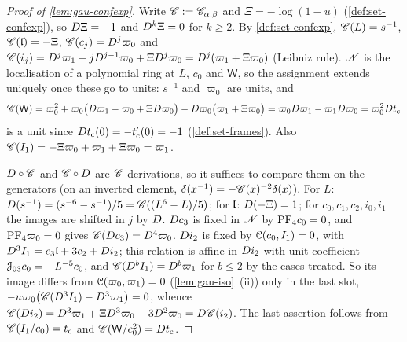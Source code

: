 \begin{proof}[Proof of \cref{lem:gau-confexp}]
Write $\mathscr{C}:=\mathscr{C}_{\alpha,\beta}$ and $\Xi=-\log(1-u)$ (\cref{def:set-confexp}), so $D\Xi=-1$ and $D^k\Xi=0$ for $k\geq2$. By \cref{def:set-confexp}, $\mathscr{C}(L)=s^{-1}$, $\mathscr{C}(\mathfrak{l})=-\Xi$, $\mathscr{C}(c_j)=D^j\varpi_0$ and $\mathscr{C}(i_j)=D^j\varpi_1-jD^{j-1}\varpi_0+\Xi D^j\varpi_0=D^j(\varpi_1+\Xi\varpi_0)$ (Leibniz rule). $\mathscr{N}$ is the localisation of a polynomial ring at $L$, $c_0$ and $\mathsf W$, so the assignment extends uniquely once these go to units: $s^{-1}$ and $\varpi_0$ are units, and
\[
\mathscr{C}(\mathsf W)=\varpi_0^2+\varpi_0\bigl(D\varpi_1-\varpi_0+\Xi D\varpi_0\bigr)-D\varpi_0\bigl(\varpi_1+\Xi\varpi_0\bigr)=\varpi_0D\varpi_1-\varpi_1D\varpi_0=\varpi_0^2Dt_{\mathrm{c}}
\]
is a unit since $Dt_{\mathrm{c}}(0)=-t_{\mathrm{c}}'(0)=-1$ (\cref{def:set-frames}). Also $\mathscr{C}(I_1)=-\Xi\varpi_0+\varpi_1+\Xi\varpi_0=\varpi_1$.

$D\circ\mathscr{C}$ and $\mathscr{C}\circ D$ are $\mathscr{C}$-derivations, so it suffices to compare them on the generators (on an inverted element, $\delta(x^{-1})=-\mathscr{C}(x)^{-2}\delta(x)$). For $L$: $D(s^{-1})=(s^{-6}-s^{-1})/5=\mathscr{C}((L^6-L)/5)$; for $\mathfrak{l}$: $D(-\Xi)=1$; for $c_0,c_1,c_2,i_0,i_1$ the images are shifted in $j$ by $D$. $D c_3$ is fixed in $\mathscr{N}$ by $\mathrm{PF}_{4} c_0=0$, and $\mathrm{PF}_{4}\varpi_0=0$ gives $\mathscr{C}(D c_3)=D^4\varpi_0$. $D i_2$ is fixed by $\mathcal{C}(c_0,I_1)=0$, with $D^3I_1=c_3\mathfrak{l}+3c_2+D i_2$; this relation is affine in $D i_2$ with unit coefficient $\mathcal{J}_{03}c_0=-L^{-5}c_0$, and $\mathscr{C}(D^bI_1)=D^b\varpi_1$ for $b\leq2$ by the cases treated. So its image differs from $\mathcal{C}(\varpi_0,\varpi_1)=0$ (\cref{lem:gau-iso}~(ii)) only in the last slot, $-u\varpi_0\bigl(\mathscr{C}(D^3I_1)-D^3\varpi_1\bigr)=0$, whence $\mathscr{C}(D i_2)=D^3\varpi_1+\Xi D^3\varpi_0-3D^2\varpi_0=D\mathscr{C}(i_2)$. The last assertion follows from $\mathscr{C}(I_1/c_0)=t_{\mathrm{c}}$ and $\mathscr{C}(\mathsf W/c_0^2)=Dt_{\mathrm{c}}$.
\end{proof}
